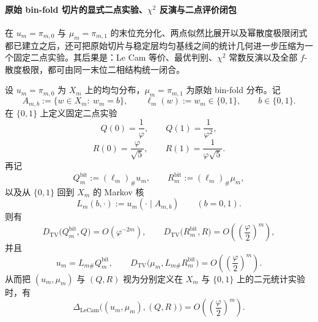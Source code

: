 \paragraph{原始 bin-fold 切片的显式二点实验、\texorpdfstring{$\chi^2$}{chi2} 反演与二点评价闭包}
在 \(u_m=\pi_{m,0}\) 与 \(\mu_m=\pi_{m,1}\) 的末位充分化、两点似然比展开以及幂散度极限闭式都已建立之后，还可把原始切片与稳定层均匀基线之间的统计几何进一步压缩为一个固定二点实验。其后果是：Le Cam 等价、最优判别、\(\chi^2\) 常数反演以及全部 \(f\)-散度极限，都可由同一末位二相结构统一闭合。

\begin{theorem}\label{thm:xi-time-part9sa-uniform-baseline-fixed-binary-experiment}
设 \(u_m=\pi_{m,0}\) 为 \(X_m\) 上的均匀分布，\(\mu_m=\pi_{m,1}\) 为原始 bin-fold 分布。记
\[
A_{m,b}:=\{w\in X_m:\ w_m=b\},
\qquad
\ell_m(w):=w_m\in\{0,1\},
\qquad
b\in\{0,1\}.
\]
在 \(\{0,1\}\) 上定义固定二点实验
\[
Q(0)=\frac1\varphi,
\qquad
Q(1)=\frac1{\varphi^2},
\]
\[
R(0)=\frac{\varphi}{\sqrt5},
\qquad
R(1)=\frac{1}{\varphi\sqrt5}.
\]
再记
\[
Q_m^{\mathrm{bit}}:=(\ell_m)_\#u_m,
\qquad
R_m^{\mathrm{bit}}:=(\ell_m)_\#\mu_m,
\]
以及从 \(\{0,1\}\) 回到 \(X_m\) 的 Markov 核
\[
L_m(b,\cdot):=u_m(\cdot\mid A_{m,b})
\qquad (b=0,1).
\]
则有
\[
D_{\mathrm{TV}}\bigl(Q_m^{\mathrm{bit}},Q\bigr)=O(\varphi^{-2m}),
\qquad
D_{\mathrm{TV}}\bigl(R_m^{\mathrm{bit}},R\bigr)
=
O\!\left(\left(\frac{\varphi}{2}\right)^m\right),
\]
并且
\[
u_m=L_{m\#}Q_m^{\mathrm{bit}},
\qquad
D_{\mathrm{TV}}\bigl(\mu_m,L_{m\#}R_m^{\mathrm{bit}}\bigr)
=
O\!\left(\left(\frac{\varphi}{2}\right)^m\right).
\]
从而把 \((u_m,\mu_m)\) 与 \((Q,R)\) 视为分别定义在 \(X_m\) 与 \(\{0,1\}\) 上的二元统计实验时，有
\[
\Delta_{\mathrm{LeCam}}\bigl((u_m,\mu_m),(Q,R)\bigr)
=
O\!\left(\left(\frac{\varphi}{2}\right)^m\right).
\]
\end{theorem}
